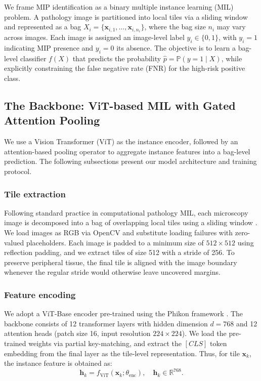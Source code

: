 \documentclass[journal,twoside,web]{ieeecolor}
\begin{document}
We frame MIP identification as a binary multiple instance learning (MIL) problem. A pathology image is partitioned into local tiles via a sliding window and represented as a bag \( X_i = \{\mathbf{x}_{i,1}, \dots, \mathbf{x}_{i,n_i}\} \), where the bag size \( n_i \) may vary across images. Each image is assigned an image-level label \( y_i \in \{0,1\} \), with \( y_i = 1 \) indicating MIP presence and \( y_i = 0 \) its absence. The objective is to learn a bag-level classifier \( f(X) \) that predicts the probability \( \hat{p} = \mathbb{P}(y = 1 \mid X) \), while explicitly constraining the false negative rate (FNR) for the high-risk positive class.

\subsection{The Backbone: ViT-based MIL with Gated Attention Pooling}
\label{sec:baseline_method}

We use a Vision Transformer (ViT) \cite{dosovitskiy2020image} as the instance encoder, followed by an attention-based pooling operator \cite{ilse2018attention} to aggregate instance features into a bag-level prediction. The following subsections present our model architecture and training protocol.

\subsubsection{Tile extraction}

Following standard practice in computational pathology MIL, each microscopy image is decomposed into a bag of overlapping local tiles using a sliding window \cite{campanella2019clinical,lu2021data}. We load images as RGB via OpenCV \cite{bradski2000opencv} and substitute loading failures with zero-valued placeholders. Each image is padded to a minimum size of $512\times512$ using reflection padding, and we extract tiles of size 512 with a stride of 256. To preserve peripheral tissue, the final tile is aligned with the image boundary whenever the regular stride would otherwise leave uncovered margins.

\subsubsection{Feature encoding}

We adopt a ViT-Base encoder pre-trained using the Phikon framework \cite{filiot2023scaling}. The backbone consists of 12 transformer layers with hidden dimension \( d = 768 \) and 12 attention heads (patch size 16, input resolution \(224\times224\)). We load the pre-trained weights via partial key-matching, and extract the \([CLS]\) token embedding from the final layer as the tile-level representation. Thus, for tile \(\mathbf{x}_k\), the instance feature is obtained as:
\begin{equation*}
    \mathbf{h}_k = f_{\text{ViT}}(\mathbf{x}_k; \theta_{\text{enc}}), \quad \mathbf{h}_k \in \mathbb{R}^{768}.
\end{equation*}
\end{document}
